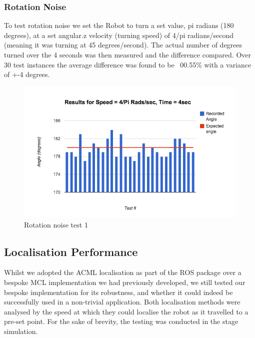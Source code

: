 \documentclass{article}
\begin{document}
	\subsubsection{Rotation Noise}
	To test rotation noise we set the Robot to turn a set value, pi radians (180 degrees), at a set angular.z velocity (turning speed) of 4/pi radians/second (meaning it was turning at 45 degrees/second). The actual number of degrees turned over the 4 seconds was then measured and the difference compared. Over 30 test instances the average difference was found to be ~00.55\% with a variance of +-4 degrees.
	\begin{figure}[H]
	\centering
	\includegraphics[width=\linewidth]{ExperimentalResults7}
	\caption{Rotation noise test 1}
	\end{figure}
	
	\subsection{Localisation Performance}
	Whilst we adopted the ACML localisation as part of the ROS package over a bespoke MCL implementation we had previously developed, we still tested our bespoke implementation for its robustness, and whether it could indeed be successfully used in a non-trivial application. Both localisation methods were analysed by the speed at which they could localise the robot as it travelled to a pre-set point. For the sake of brevity, the testing was conducted in the stage simulation.
\end{document}
